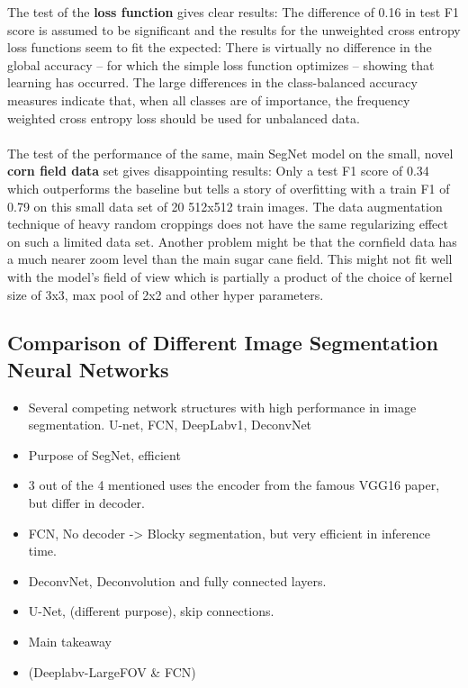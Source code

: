 \documentclass{article}
\begin{document}
\noindent
The test of the \textbf{loss function} gives clear results: The difference of 0.16 in test F1 score is assumed to be significant and the results for the unweighted cross entropy loss functions seem to fit the expected:
There is virtually no difference in the global accuracy -- for which the simple loss function optimizes -- showing that learning has occurred.
The large differences in the class-balanced accuracy measures indicate that, when all classes are of importance, the frequency weighted cross entropy loss should be used  for unbalanced data.
\\
\\
The test of the performance of the same, main SegNet model on the small, novel \textbf{corn field data} set gives disappointing results: Only a test F1 score of 0.34 which outperforms the baseline but tells a story of overfitting with a train F1 of 0.79 on this small data set of 20 512x512 train images.
 The data augmentation technique of heavy random croppings does not have the same regularizing effect on such a limited data set. 
Another problem might be that the cornfield data has a much nearer zoom level than the main sugar cane field.
This might not fit well with the model's field of view which is partially a product of the choice of kernel size of 3x3, max pool of 2x2 and other hyper parameters.

\label{sec:foot}
\subsection{Comparison of Different Image Segmentation Neural Networks}
\begin{itemize}
	\item Several competing network structures with high performance in image segmentation. U-net, FCN, DeepLabv1, DeconvNet
	\item Purpose of SegNet, efficient
	\item 3 out of the 4 mentioned uses the encoder from the famous VGG16 paper, but differ in decoder.
	\item FCN, No decoder -> Blocky segmentation, but very efficient in inference time.
	\item DeconvNet, Deconvolution and fully connected layers. 
	\item U-Net, (different purpose), skip connections. 
	\item Main takeaway  
	\item (Deeplabv-LargeFOV \& FCN)
\end{itemize}
	
\end{document}
